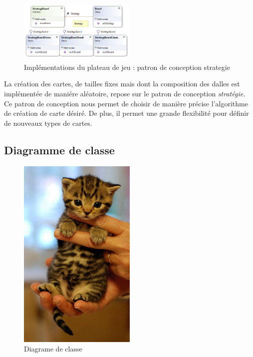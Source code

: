 		\begin{figure}[h]
			\begin{center}
				\includegraphics[width=0.5\textwidth]{figure/strategy.png}
			\end{center}
			\caption{Implémentations du plateau de jeu : patron de conception strategie}
			\label{fig:strategy}
		\end{figure}

		La création des cartes, de tailles fixes mais dont la composition des dalles est implémentée de maniére aléatoire, repose sur le patron de conception \emph{stratégie}. Ce patron de conception nous permet de choisir de manière précise l'algorithme de création de carte désiré. De plus, il permet une grande flexibilité pour définir de nouveaux types de cartes.



	\subsection{Diagramme de classe}


	\begin{figure}
		\begin{center}
			\includegraphics[width=0.5\textwidth]{figure/diagramme_de_classe.png}
		\end{center}
		\caption{Diagrame de classe}
		\label{fig:planif}
	\end{figure}




